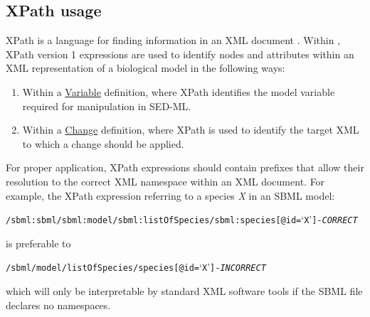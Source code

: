 \subsection{XPath usage}  

\label{sec:xpath} 
XPath is a language for finding information in an XML document \citep{xpath:1999}. Within \LoneVtwo, XPath version 1 expressions are  used to identify nodes and attributes within an XML representation of a biological model in the following ways:
%
\begin{enumerate}
\item {Within a \hyperref[class:variable]{Variable} definition, where XPath identifies the model variable required for manipulation in SED-ML.}
\item {Within a  \hyperref[class:change]{Change} definition, where XPath is used to identify the target XML to which a change should be applied.} 

\end{enumerate}

For proper application, XPath expressions should contain prefixes that allow their resolution to the correct XML namespace within an XML document. For example, the XPath expression referring to a species \emph{X} in an SBML model:
\begin{alltt}
/sbml:sbml/sbml:model/sbml:listOfSpecies/sbml:species[@id=`X'] {\color{green} \tickYes -\emph{CORRECT}}
\end{alltt}
is preferable to 
\begin{alltt}
/sbml/model/listOfSpecies/species[@id=`X'] {\color{red} \tickNo -\emph{INCORRECT} }
\end{alltt}

which will only be interpretable by standard XML software tools  if the SBML file declares no namespaces. 





